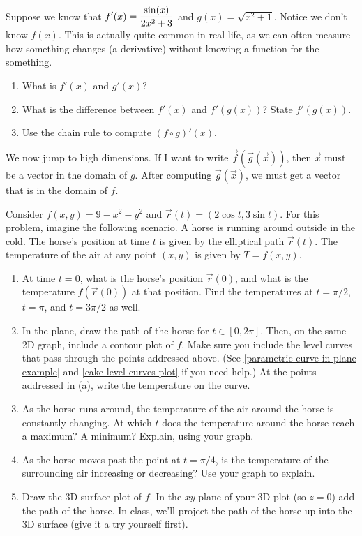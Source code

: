 \begin{problem}\label{chain rule review problem}
 Suppose we know that $\displaystyle f'(x) = \frac{\sin(x)}{2x^2+3}$ and $g(x)=\sqrt{x^2+1}$. Notice we don't know $f(x)$.  This is actually quite common in real life, as we can often measure how something changes (a derivative) without knowing a function for the something.
\begin{enumerate}
 \item What is $f'(x)$ and $g'(x)$?
 \item What is the difference between $f'(x)$ and $f'(g(x))$? State $f'(g(x))$.
 \item Use the chain rule to compute $(f\circ g)'(x)$.
\end{enumerate}
\end{problem}

We now jump to high dimensions. If I want to write $\vec f(\vec g(\vec x))$, then $\vec x$ must be a vector in the domain of $g$.  After computing $\vec g(\vec x)$, we must get a vector that is in the domain of $f$. 

\begin{problem}
 Consider $f(x,y)=9-x^2-y^2$ and $\vec r(t)=(2\cos t, 3\sin t)$. For this problem, imagine the following scenario.  A horse is running around outside in the cold. The horse's position at time $t$ is given by the elliptical path $\vec r(t)$. The temperature of the air at any point $(x,y)$ is given by $T=f(x,y)$.  
\begin{enumerate}
 \item At time $t=0$, what is the horse's position $\vec r(0)$, and what is the temperature $f(\vec r(0))$ at that position. Find the temperatures at $t=\pi/2$, $t=\pi$, and $t=3\pi/2$ as well. 
 \item In the plane, draw the path of the horse for $t\in [0,2\pi]$. Then, on the same 2D graph, include a contour plot of $f$. Make sure you include the level curves that pass through the points addressed above. (See  \ref{parametric curve in plane example} and \ref{cake level curves plot} if you need help.) At the points addressed in (a), write the temperature on the curve.
 \item{}%
 As the horse runs around, the temperature of the air around the horse is constantly changing. 
At which $t$ does the temperature around the horse reach a maximum?  A minimum?  Explain, using your graph. 
 \item As the horse moves past the point at $t=\pi/4$, is the temperature of the surrounding air increasing or decreasing? Use your graph to explain.
 \item Draw the 3D surface plot of $f$. In the $xy$-plane of your 3D plot (so $z=0$) add the path of the horse. In class, we'll project the path of the horse up into the 3D surface (give it a try yourself first). 
\end{enumerate}
\end{problem}

